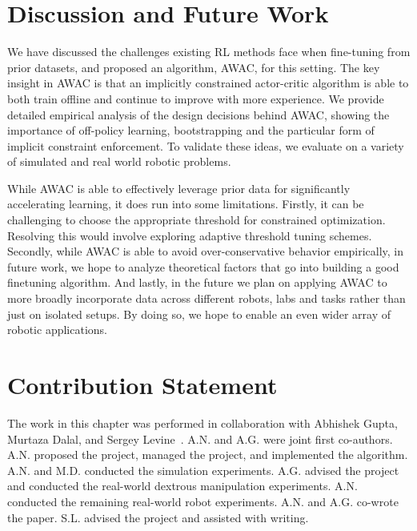 \section{Discussion and Future Work}\label{sec:conclusion}

We have discussed the challenges existing RL methods face when fine-tuning from prior datasets, and proposed an algorithm, AWAC, for this setting. The key insight in AWAC is that an implicitly constrained actor-critic algorithm is able to both train offline and continue to improve with more experience. We provide detailed empirical analysis of the design decisions behind AWAC, showing the importance of off-policy learning, bootstrapping and the particular form of implicit constraint enforcement. To validate these ideas, we evaluate on a variety of simulated and real world robotic problems. 

While AWAC is able to effectively leverage prior data for significantly accelerating learning, it does run into some limitations. Firstly, it can be challenging to choose the appropriate threshold for constrained optimization. Resolving this would involve exploring adaptive threshold tuning schemes. Secondly, while AWAC is able to avoid over-conservative behavior empirically, in future work, we hope to analyze theoretical factors that go into building a good finetuning algorithm. And lastly, in the future we plan on applying AWAC to more broadly incorporate data across different robots, labs and tasks rather than just on isolated setups. By doing so, we hope to enable an even wider array of robotic applications.

\section{Contribution Statement}

The work in this chapter was performed in collaboration with Abhishek Gupta, Murtaza Dalal, and Sergey Levine~\citep{nair2020awac}. A.N. and A.G. were joint first co-authors. A.N. proposed the project, managed the project, and implemented the algorithm. A.N. and M.D. conducted the simulation experiments. A.G. advised the project and conducted the real-world dextrous manipulation experiments. A.N. conducted the remaining real-world robot experiments. A.N. and A.G. co-wrote the paper. S.L. advised the project and assisted with writing.
